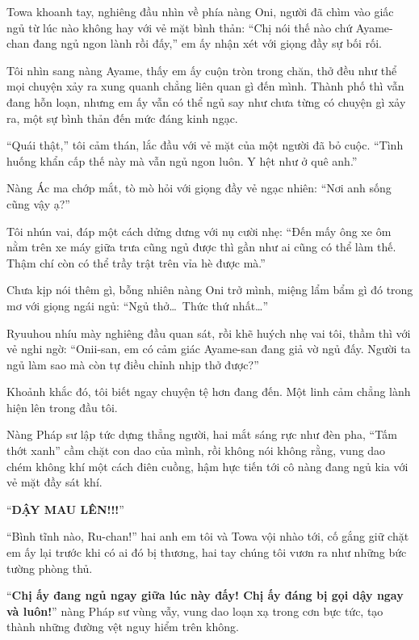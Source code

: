 \documentclass[../main.tex]{subfiles}
\begin{document}
Towa khoanh tay, nghiêng đầu nhìn về phía nàng Oni, người đã chìm vào giấc ngủ từ lúc nào không hay với vẻ mặt bình thản: ``Chị nói thế nào chứ Ayame-chan đang ngủ ngon lành rồi đấy,'' em ấy nhận xét với giọng đầy sự bối rối.

Tôi nhìn sang nàng Ayame, thấy em ấy cuộn tròn trong chăn, thở đều như thể mọi chuyện xảy ra xung quanh chẳng liên quan gì đến mình. Thành phố thì vẫn đang hỗn loạn, nhưng em ấy vẫn có thể ngủ say như chưa từng có chuyện gì xảy ra, một sự bình thản đến mức đáng kinh ngạc.

``Quái thật,'' tôi cảm thán, lắc đầu với vẻ mặt của một người đã bỏ cuộc. ``Tình huống khẩn cấp thế này mà vẫn ngủ ngon luôn. Y hệt như ở quê anh.''


Nàng Ác ma chớp mắt, tò mò hỏi với giọng đầy vẻ ngạc nhiên: ``Nơi anh sống cũng vậy ạ?''

Tôi nhún vai, đáp một cách dửng dưng với nụ cười nhẹ: ``Đến mấy ông xe ôm nằm trên xe máy giữa trưa cũng ngủ được thì gần như ai cũng có thể làm thế. Thậm chí còn có thể trầy trật trên vỉa hè được mà.''

Chưa kịp nói thêm gì, bỗng nhiên nàng Oni trở mình, miệng lẩm bẩm gì đó trong mơ với giọng ngái ngủ: ``Ngủ thở\dots\ Thức thứ nhất\dots''

Ryuuhou nhíu mày nghiêng đầu quan sát, rồi khẽ huých nhẹ vai tôi, thầm thì với vẻ nghi ngờ: ``Onii-san, em có cảm giác Ayame-san đang giả vờ ngủ đấy. Người ta ngủ làm sao mà còn tự điều chỉnh nhịp thở được?''

Khoảnh khắc đó, tôi biết ngay chuyện tệ hơn đang đến. Một linh cảm chẳng lành hiện lên trong đầu tôi.

Nàng Pháp sư lập tức dựng thẳng người, hai mắt sáng rực như đèn pha, ``Tấm thớt xanh'' cầm chặt con dao của mình, rồi không nói không rằng, vung dao chém không khí một cách điên cuồng, hậm hực tiến tới cô nàng đang ngủ kia với vẻ mặt đầy sát khí.

``\textbf{DẬY MAU LÊN!!!}''


``Bình tĩnh nào, Ru-chan!'' hai anh em tôi và Towa vội nhào tới, cố gắng giữ chặt em ấy lại trước khi có ai đó bị thương, hai tay chúng tôi vươn ra như những bức tường phòng thủ.

``\textbf{Chị ấy đang ngủ ngay giữa lúc này đấy! Chị ấy đáng bị gọi dậy ngay và luôn!}'' nàng Pháp sư vùng vẫy, vung dao loạn xạ trong cơn bực tức, tạo thành những đường vệt nguy hiểm trên không.
\end{document}
